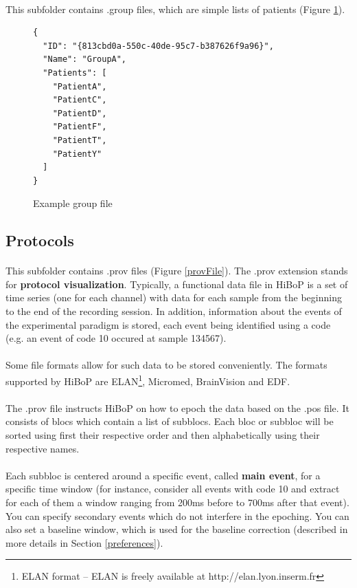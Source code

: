 \documentclass[a4paper]{article}
\begin{document}
\paragraph{} This subfolder contains .group files, which are simple lists of patients (Figure \ref{groupFile}).
\begin{figure}[H]
\begin{lstlisting}
{
  "ID": "{813cbd0a-550c-40de-95c7-b387626f9a96}",
  "Name": "GroupA",
  "Patients": [
    "PatientA",
    "PatientC",
    "PatientD",
    "PatientF",
    "PatientT",
    "PatientY"
  ]
}
\end{lstlisting}
\caption{\label{groupFile}Example group file}
\end{figure}
\subsection{Protocols}
\paragraph{} This subfolder contains .prov files (Figure \ref{provFile}). The .prov extension stands for \textbf{protocol visualization}. Typically, a functional data file in HiBoP is a set of time series (one for each channel) with data for each sample from the beginning to the end of the recording session. In addition, information about the events of the experimental paradigm is stored, each event being identified using a code (e.g. an event of code 10 occured at sample 134567).
\paragraph{} Some file formats allow for such data to be stored conveniently. The formats supported by HiBoP are ELAN\footnote{\label{ELAN}ELAN format – ELAN is freely available at http://elan.lyon.inserm.fr}, Micromed, BrainVision and EDF.
\paragraph{} The .prov file instructs HiBoP on how to epoch the data based on the .pos file. It consists of blocs which contain a list of subblocs. Each bloc or subbloc will be sorted using first their respective order and then alphabetically using their respective names.
\paragraph{} Each subbloc is centered around a specific event, called \textbf{main event}, for a specific time window (for instance, consider all events with code 10 and extract for each of them a window ranging from 200ms before to 700ms after that event). You can specify secondary events which do not interfere in the epoching. You can also set a baseline window, which is used for the baseline correction (described in more details in Section \ref{preferences}). 
\end{document}
